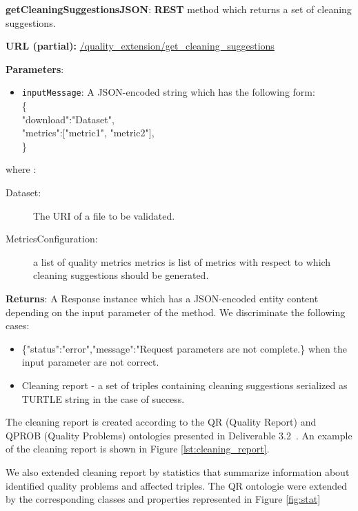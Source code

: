 \begin{description}

\item{\textbf{getCleaningSuggestionsJSON}:} \textbf{REST} method which returns a set of cleaning suggestions.

\textbf{URL (partial):} \url{/quality_extension/get_cleaning_suggestions} 

\textbf{Parameters}: 
\begin{itemize}
\item \texttt{inputMessage}: A JSON-encoded string which has the following form: \\
\{ \\
\hspace*{0.5 cm}"download":"Dataset", \\
\hspace*{0.5 cm}"metrics":["metric1", "metric2"], \\ 
\} \\
\end{itemize}
where : 
\begin{description}
\item[Dataset:] The URI of a file to be validated. 
\item[MetricsConfiguration:] a list of quality metrics metrics is list of metrics with respect to which cleaning suggestions should be generated. 
\end{description}




\textbf{Returns}: A Response instance which has a JSON-encoded entity content depending on the input parameter of the method. We discriminate the following cases: 
\begin{itemize}
\item  \{"status":"error","message":"Request parameters are not complete.\} when the input parameter are not correct. 
\item  Cleaning report -  a set of triples containing cleaning suggestions serialized as TURTLE string in the case of success.
\end{itemize}
The cleaning report is created according to the QR (Quality Report) and QPROB (Quality Problems) ontologies presented in Deliverable 3.2~\cite{d3.2}.
An example of the cleaning report is shown in Figure \ref{lst:cleaning_report}.


We also extended cleaning report by statistics that summarize information about identified quality problems and affected triples. 
The QR ontologie were extended by the corresponding classes and properties represented in Figure \ref{fig:stat}


\end{description}
